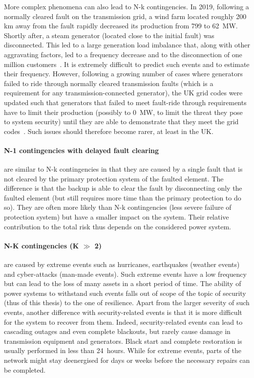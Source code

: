 More complex phenomena can also lead to N-k contingencies. In 2019, following a normally cleared fault on the transmission grid, a wind farm located roughly 200 km away from the fault rapidly decreased its production from 799 to 62~MW. Shortly after, a steam generator (located close to the initial fault) was disconnected. This led to a large generation load imbalance that, along with other aggravating factors, led to a frequency decrease and to the disconnection of one million customers~\cite{2019UKBlackout}. It is extremely difficult to predict such events and to estimate their frequency. However, following a growing number of cases where generators failed to ride through normally cleared transmission faults (which is a requirement for any transmission-connected generator), the UK grid codes were updated such that generators that failed to meet fault-ride through requirements have to limit their production (possibly to 0~MW, to limit the threat they pose to system security) until they are able to demonstrate that they meet the grid codes~\cite{FaultRideThroughEnforcement}. Such issues should therefore become rarer, at least in the UK.


\paragraph*{N-1 contingencies with delayed fault clearing} are similar to N-k contingencies in that they are caused by a single fault that is not cleared by the primary protection system of the faulted element. The difference is that the backup is able to clear the fault by disconnecting only the faulted element (but still requires more time than the primary protection to do so). They are often more likely than N-k contingencies (less severe failure of protection system) but have a smaller impact on the system. Their relative contribution to the total risk thus depends on the considered power system.


\paragraph*{N-K contingencies (K \(\gg\) 2)} are caused by extreme events such as hurricanes, earthquakes (weather events) and cyber-attacks (man-made events). Such extreme events have a low frequency but can lead to the loss of many assets in a short period of time. The ability of power systems to withstand such events falls out of scope of the topic of security (thus of this thesis) to the one of resilience. Apart from the larger severity of such events, another difference with security-related events is that it is more difficult for the system to recover from them. Indeed, security-related events can lead to cascading outages and even complete blackouts, but rarely cause damage in transmission equipment and generators. Black start and complete restoration is usually performed in less than 24~hours. While for extreme events, parts of the network might stay deenergised for days or weeks before the necessary repairs can be completed.


